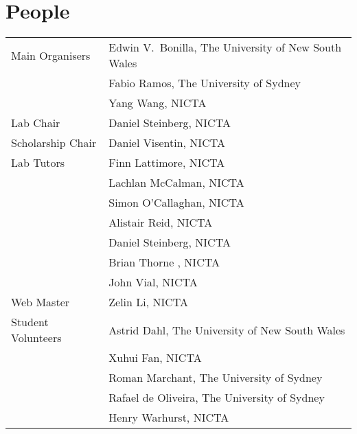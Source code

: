 
{}
\section*{People}


\begin{tabular}{p{4.5cm}p{10cm}}
Main Organisers 
& Edwin V.~Bonilla, The University of New South Wales \\ [2mm]
& Fabio Ramos, The University of Sydney \\ [2mm]
& Yang Wang, NICTA  \\ [2mm]
Lab Chair
&
Daniel Steinberg, NICTA \\ [3mm]
Scholarship Chair
& 
Daniel Visentin, NICTA \\ [3mm]
Lab Tutors
&
Finn Lattimore,  NICTA \\ [2mm]
&  Lachlan McCalman, NICTA \\ [2mm]
& Simon O'Callaghan, NICTA \\ [2mm]
& Alistair Reid,  NICTA \\ [2mm]
& Daniel Steinberg, NICTA \\ [2mm]
& Brian Thorne , NICTA \\ [2mm]
& John Vial, NICTA  \\ [3mm]
Web Master 
&
Zelin Li, NICTA \\ [3mm]
Student Volunteers 
& Astrid Dahl, The University of New South Wales  \\ [2mm]
& Xuhui Fan, NICTA   \\ [2mm]
& Roman Marchant, The University of Sydney  \\ [2mm]
& Rafael de Oliveira, The University of Sydney  \\ [2mm]
& Henry Warhurst,  NICTA 
\end{tabular}





